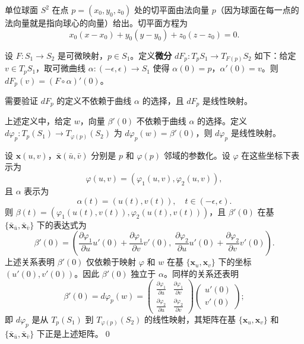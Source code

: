 \begin{Example}[球面的切平面]\label{ex:sphere-tangent-plane}
单位球面 $S^2$ 在点 $p = (x_0, y_0, z_0)$ 处的切平面由法向量 $p$（因为球面在每一点的法向量就是指向球心的向量）给出。切平面方程为
\[
x_0(x - x_0) + y_0(y - y_0) + z_0(z - z_0) = 0.
\]
\end{Example}

\begin{Definition}[可微映射的微分]\label{def:differential-map}
设 $F: S_1 \to S_2$ 是可微映射，$p \in S_1$。定义\textbf{微分} $dF_p: T_pS_1 \to T_{F(p)}S_2$ 如下：给定 $v \in T_pS_1$，取可微曲线 $\alpha: (-\epsilon, \epsilon) \to S_1$ 使得 $\alpha(0) = p$，$\alpha'(0) = v$。则 $dF_p(v) = (F \circ \alpha)'(0)$。
\end{Definition}

需要验证 $dF_p$ 的定义不依赖于曲线 $\alpha$ 的选择，且 $dF_p$ 是线性映射。

\begin{Proposition}[微分的线性性]\label{prop:differential-linear}
上述定义中，给定 $w$，向量 $\beta'(0)$ 不依赖于曲线 $\alpha$ 的选择。定义 $d\varphi_p: T_p(S_1) \to T_{\varphi(p)}(S_2)$ 为 $d\varphi_p(w) = \beta'(0)$，则 $d\varphi_p$ 是线性映射。
\end{Proposition}

\begin{Proof}
设 $\mathbf{x}(u,v)$，$\bar{\mathbf{x}}(\bar{u},\bar{v})$ 分别是 $p$ 和 $\varphi(p)$ 邻域的参数化。设 $\varphi$ 在这些坐标下表示为
\[
\varphi(u, v) = (\varphi_1(u, v), \varphi_2(u, v)),
\]
且 $\alpha$ 表示为
\[
\alpha(t) = (u(t), v(t)),\quad t \in (-\epsilon, \epsilon).
\]
则 $\beta(t) = (\varphi_1(u(t), v(t)), \varphi_2(u(t), v(t)))$，且 $\beta'(0)$ 在基 $\{\bar{\mathbf{x}}_{\bar{u}}, \bar{\mathbf{x}}_{\bar{v}}\}$ 下的表达式为
\[
\beta'(0) = \left(\frac{\partial \varphi_1}{\partial u} u'(0) + \frac{\partial \varphi_1}{\partial v} v'(0),\; \frac{\partial \varphi_2}{\partial u} u'(0) + \frac{\partial \varphi_2}{\partial v} v'(0)\right).
\]
上述关系表明 $\beta'(0)$ 仅依赖于映射 $\varphi$ 和 $w$ 在基 $\{\mathbf{x}_u, \mathbf{x}_v\}$ 下的坐标 $(u'(0), v'(0))$。因此 $\beta'(0)$ 独立于 $\alpha$。同样的关系还表明
\[
\beta'(0) = d\varphi_p(w) = \begin{pmatrix} \frac{\partial \varphi_1}{\partial u} & \frac{\partial \varphi_1}{\partial v} \\ \frac{\partial \varphi_2}{\partial u} & \frac{\partial \varphi_2}{\partial v} \end{pmatrix} \begin{pmatrix} u'(0) \\ v'(0) \end{pmatrix};
\]
即 $d\varphi_p$ 是从 $T_p(S_1)$ 到 $T_{\varphi(p)}(S_2)$ 的线性映射，其矩阵在基 $\{\mathbf{x}_u,\mathbf{x}_v\}$ 和 $\{\bar{\mathbf{x}}_{\bar{u}},\bar{\mathbf{x}}_{\bar{v}}\}$ 下正是上述矩阵。\qed
\end{Proof}

